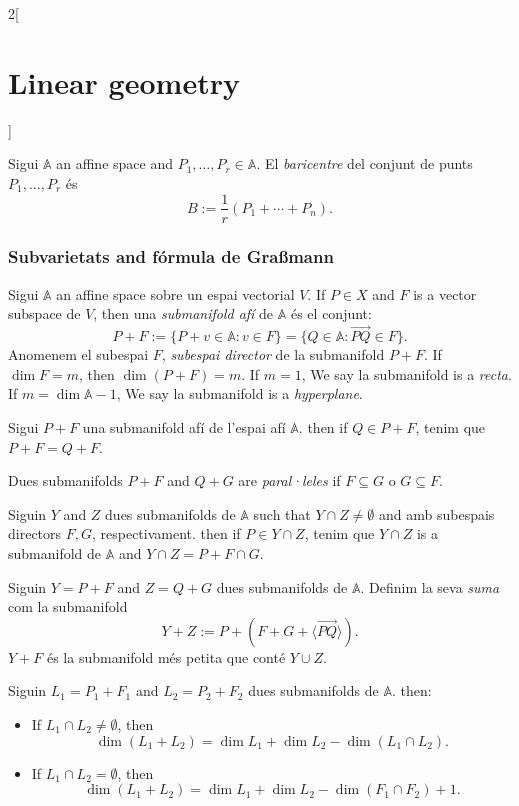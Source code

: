 \documentclass[class=article,10pt,crop=false]{standalone}
\begin{document}
\begin{multicols}{2}[\section{Linear geometry}]
\begin{definition}
\end{definition}
\begin{definition}
Sigui $\mathbb{A}$ an affine space and $P_1,\ldots,P_r\in\mathbb{A}$. El \textit{baricentre} del conjunt de punts $P_1,\ldots,P_r$ és $$B:=\frac{1}{r}\left(P_1+\cdots+P_n\right).$$
\end{definition}
\subsubsection{Subvarietats and fórmula de Gra\ss mann}
\begin{definition}
Sigui $\mathbb{A}$ an affine space sobre un espai vectorial $V$. If $P\in X$ and $F$ is a vector subspace de $V$, then una \textit{submanifold afí} de $\mathbb{A}$ és el conjunt: $$P+F:=\{P+v\in\mathbb{A}:v\in F\}=\{Q\in\mathbb{A}:\overrightarrow{PQ}\in F\}.$$ Anomenem el subespai $F$, \textit{subespai director} de la submanifold $P+F$. If $\dim F=m$, then $\dim (P+F)=m$. If $m=1$, We say la submanifold is a \textit{recta}. If $m=\dim\mathbb{A}-1$, We say la submanifold is a \textit{hyperplane}.
\end{definition}
\begin{prop}
Sigui $P+F$ una submanifold afí de l'espai afí $\mathbb{A}$. then if $Q\in P+F$, tenim que $P+F=Q+F$.
\end{prop}
\begin{definition}
Dues submanifolds $P+F$ and $Q+G$ are \textit{paral·leles} if $F\subseteq G$ o $G\subseteq F$.
\end{definition}
\begin{definition}
Siguin $Y$ and $Z$ dues submanifolds de $\mathbb{A}$ such that $Y\cap Z\ne\emptyset$ and amb subespais directors $F,G$, respectivament. then if $P\in Y\cap Z$, tenim que $Y\cap Z$ is a submanifold de $\mathbb{A}$ and $Y\cap Z=P+F\cap G$.
\end{definition}
\begin{definition}
Siguin $Y=P+F$ and $Z=Q+G$ dues submanifolds de $\mathbb{A}$. Definim la seva \textit{suma} com la submanifold $$Y+Z:=P+\left(F+G+\langle\overrightarrow{PQ}\rangle\right).$$ $Y+F$ és la submanifold més petita que conté $Y\cup Z$.
\end{definition}
\begin{theorem}
Siguin $L_1=P_1+F_1$ and $L_2=P_2+F_2$ dues submanifolds de $\mathbb{A}$. then:
\begin{itemize}
    \item If $L_1\cap L_2\ne\emptyset$, then $$\dim (L_1+L_2)=\dim L_1+\dim L_2-\dim (L_1\cap L_2).$$
    \item If $L_1\cap L_2=\emptyset$, then $$\dim (L_1+L_2)=\dim L_1+\dim L_2-\dim (F_1\cap F_2)+1.$$
\end{itemize}
\end{theorem}

\end{multicols}
\end{document}
